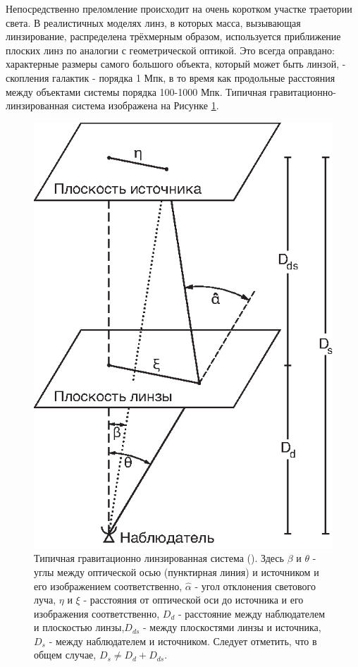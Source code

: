 Непосредственно преломление происходит на очень коротком участке траетории света. В реалистичных моделях линз, в которых масса, вызывающая линзирование, распределена трёхмерным образом, используется приближение плоских линз по аналогии с геометрической оптикой. Это всегда оправдано: характерные размеры самого большого объекта, который может быть линзой, - скопления галактик - порядка 1 Мпк, в то время как продольные расстояния между объектами системы порядка 100-1000 Мпк. Типичная гравитационно-линзированная система изображена на Рисунке \ref{fig:gravlensfig}. 

\begin{figure}[H]
    \centering
	\includegraphics[scale=1.0]{pics/gr-lens-syst.eps}
	\caption{Типичная гравитационно линзированная система (\cite{gravlensbook}). Здесь $\beta$ и $\theta$ - углы между оптической осью (пунктирная линия) и источником и его изображением соответственно, $\hat{\alpha}$ - угол отклонения светового луча, $\eta$ и $\xi$ - расстояния от оптической оси до источника и его изображения соответственно,  $D_d$ - расстояние между наблюдателем и плоскостью линзы,$ D_{ds}$ - между плоскостями линзы и источника, $D_s$ - между наблюдателем и источником. Следует отметить, что в общем случае, $D_s \neq D_d + D_{ds}$.}
	\label{fig:gravlensfig}
\end{figure} 

